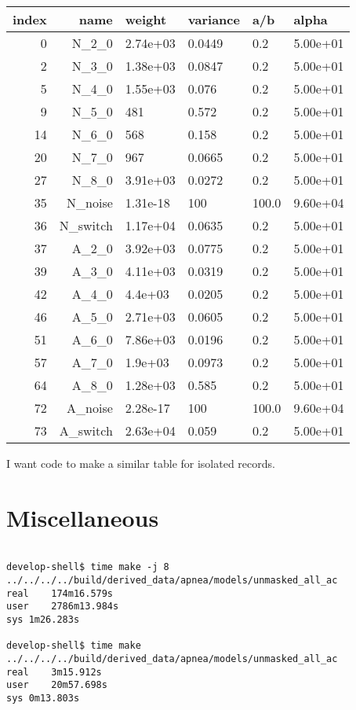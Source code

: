 \documentclass[12pt]{article}
\begin{document}
\begin{description}
  \begin{tabular*}{1.0\linewidth}[c]{rrllll}
    index & name & weight &  variance & a/b &    alpha \\ \hline
  0 & N\_2\_0     &    2.74e+03  &  0.0449 &  0.2& 5.00e+01 \\
  2 & N\_3\_0     &    1.38e+03  &  0.0847 &  0.2& 5.00e+01 \\
  5 & N\_4\_0     &    1.55e+03  &   0.076 &  0.2& 5.00e+01 \\
  9 & N\_5\_0     &    481       &   0.572 &  0.2& 5.00e+01 \\
 14 & N\_6\_0     &    568       &   0.158 &  0.2& 5.00e+01 \\
 20 & N\_7\_0     &    967       &  0.0665 &  0.2& 5.00e+01 \\
 27 & N\_8\_0     &    3.91e+03  &  0.0272 &  0.2& 5.00e+01 \\
 35 & N\_noise   &    1.31e-18  &     100 &100.0& 9.60e+04 \\
 36 & N\_switch  &    1.17e+04  &  0.0635 &  0.2& 5.00e+01 \\
 37 & A\_2\_0     &    3.92e+03  &  0.0775 &  0.2& 5.00e+01 \\
 39 & A\_3\_0     &    4.11e+03  &  0.0319 &  0.2& 5.00e+01 \\
 42 & A\_4\_0     &    4.4e+03   &  0.0205 &  0.2& 5.00e+01 \\
 46 & A\_5\_0     &    2.71e+03  &  0.0605 &  0.2& 5.00e+01 \\
 51 & A\_6\_0     &    7.86e+03  &  0.0196 &  0.2& 5.00e+01 \\
 57 & A\_7\_0     &    1.9e+03   &  0.0973 &  0.2& 5.00e+01 \\
 64 & A\_8\_0     &    1.28e+03  &   0.585 &  0.2& 5.00e+01 \\
 72 & A\_noise   &    2.28e-17  &     100 &100.0& 9.60e+04 \\
 73 & A\_switch  &    2.63e+04  &   0.059 &  0.2& 5.00e+01
  \end{tabular*}
  I want code to make a similar table for isolated records.

\end{description}

\section{Miscellaneous}
\label{sec:misc}
\begin{verbatim}

develop-shell$ time make -j 8 ../../../../build/derived_data/apnea/models/unmasked_all_ac  
real	174m16.579s
user	2786m13.984s
sys	1m26.283s

develop-shell$ time make ../../../../build/derived_data/apnea/models/unmasked_all_ac
real	3m15.912s
user	20m57.698s
sys	0m13.803s

\end{verbatim}
\end{document}
